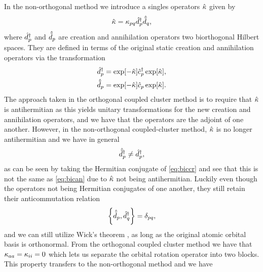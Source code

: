             In the non-orthogonal method we introduce a singles operators
            $\hat{\kappa}$ given by
            \begin{align}
                \hat{\kappa} = \kappa_{pq}\hat{d}^{\dagger}_{p}\hat{\tilde{d}}_{q},
            \end{align}
            where $\hat{d}^{\dagger}_{p}$ and $\hat{\tilde{d}}_{p}$ are creation and annihilation
            operators two biorthogonal Hilbert spaces.
            They are defined in terms of the original static creation and
            annihilation operators via the transformation
            \cite{helgaker-molecular, rolf-nocc}
            \begin{gather}
                \hat{d}^{\dagger}_{p}
                = \exp[-\hat{\kappa}]\hat{c}_{p}^{\dagger}\exp[\hat{\kappa}],
                \label{eq:biccr}
                \\
                \hat{\tilde{d}}_{p}
                = \exp[-\hat{\kappa}]\hat{c}_{p}\exp[\hat{\kappa}].
                \label{eq:bican}
            \end{gather}
            The approach taken in the orthogonal coupled cluster method is to
            require that $\hat{\kappa}$ is antihermitian as this yields unitary
            transformations for the new creation and annihilation operators, and
            we have that the operators are the adjoint of one another.
            However, in the non-orthogonal coupled-cluster method, $\hat{\kappa}$ is no
            longer antihermitian and we have in general
            \begin{align}
                \hat{\tilde{d}}_{p}^{\dagger} \neq \hat{d}^{\dagger}_{p},
            \end{align}
            as can be seen by taking the Hermitian conjugate of
            \autoref{eq:biccr} and see that this is not the same as
            \autoref{eq:bican} due to $\hat{\kappa}$ not being antihermitian.
            Luckily even though the operators not being Hermitian conjugates of
            one another, they still retain their anticommutation relation
            \cite{balian1969, lowdin-bi}
            \begin{align}
                \left\{\hat{\tilde{d}}_{p}, \hat{d}^{\dagger}_{q}\right\} = \delta_{pq},
            \end{align}
            and we can still utilize Wick's theorem \cite{rolf-nocc,
            kvaal2012ab}, as long as the original atomic orbital basis is
            orthonormal.
            From the orthogonal coupled cluster method we have that
            $\kappa_{aa} = \kappa_{ii} = 0$ which lets us separate the
            orbital rotation operator into two blocks.
            This property transfers to the non-orthogonal method and we have
